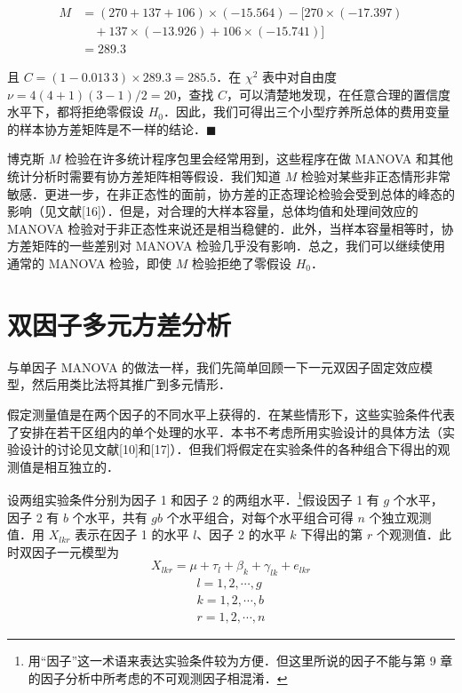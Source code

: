 
\[
\begin{aligned}
M&=(270+137+106)\times(-15.564)-[270\times(-17.397)\\
&\quad +137\times(-13.926)+106\times(-15.741)]\\
&=289.3
\end{aligned}
\]

且 $C=(1-0.013\,3)\times289.3=285.5$．在 $\chi^2$ 表中对自由度 $\nu=4(4+1)(3-1)/2=20$，查找 $C$，可以清楚地发现，在任意合理的置信度水平下，都将拒绝零假设 $H_0$．因此，我们可得出三个小型疗养所总体的费用变量的样本协方差矩阵是不一样的结论．\hfill$\blacksquare$

博克斯 $M$ 检验在许多统计程序包里会经常用到，这些程序在做 MANOVA 和其他统计分析时需要有协方差矩阵相等假设．我们知道 $M$ 检验对某些非正态情形非常敏感．更进一步，在非正态性的面前，协方差的正态理论检验会受到总体的峰态的影响（见文献[16]）．但是，对合理的大样本容量，总体均值和处理间效应的 MANOVA 检验对于非正态性来说还是相当稳健的．此外，当样本容量相等时，协方差矩阵的一些差别对 MANOVA 检验几乎没有影响．总之，我们可以继续使用通常的 MANOVA 检验，即使 $M$ 检验拒绝了零假设 $H_0$．

\section{双因子多元方差分析}
\label{sec:6.7}

与单因子 MANOVA 的做法一样，我们先简单回顾一下一元双因子固定效应模型，然后用类比法将其推广到多元情形．


假定测量值是在两个因子的不同水平上获得的．在某些情形下，这些实验条件代表了安排在若干区组内的单个处理的水平．本书不考虑所用实验设计的具体方法（实验设计的讨论见文献[10]和[17]）．但我们将假定在实验条件的各种组合下得出的观测值是相互独立的．

设两组实验条件分别为因子 1 和因子 2 的两组水平．\footnote{用“因子”这一术语来表达实验条件较为方便．但这里所说的因子不能与第 9 章的因子分析中所考虑的不可观测因子相混淆．}假设因子 1 有 $g$ 个水平，因子 2 有 $b$ 个水平，共有 $gb$ 个水平组合，对每个水平组合可得 $n$ 个独立观测值．用 $X_{lkr}$ 表示在因子 1 的水平 $l$、因子 2 的水平 $k$ 下得出的第 $r$ 个观测值．此时双因子一元模型为
\label{eq:6-54}
\begin{equation}
X_{lkr}=\mu+\tau_l+\beta_k+\gamma_{lk}+e_{lkr} \tag{6-54}
\end{equation}
\[
\begin{array}{c}
l=1,2,\cdots,g\\
k=1,2,\cdots,b\\
r=1,2,\cdots,n
\end{array}
\]

